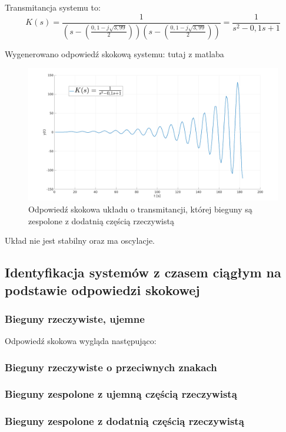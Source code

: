\documentclass[12pt]{article}
\begin{document}
Transmitancja systemu to:
\begin{equation}
    K(s) = \frac{1}{(s-(\frac{0,1 - j \sqrt{3,99}}{2}))(s-(\frac{0,1 - j \sqrt{3,99}}{2}))} = \frac{1}{s^2-0,1s+1}
\end{equation}

Wygenerowano odpowiedź skokową systemu:
\colorbox{WildStrawberry}{tutaj z matlaba}

\begin{figure}[H]
    \centering
    \includegraphics[width=18cm]{zespolone_dodatnia.png}
    \caption{Odpowiedź skokowa układu o transmitancji, której bieguny są zespolone z dodatnią częścią rzeczywistą}
\end{figure}

Układ nie jest stabilny oraz ma oscylacje.


\subsection{Identyfikacja systemów z czasem ciągłym na podstawie odpowiedzi skokowej}
\subsubsection{Bieguny rzeczywiste, ujemne}

Odpowiedź skokowa wygląda następująco:



\subsubsection{Bieguny rzeczywiste o przeciwnych znakach}
\subsubsection{Bieguny zespolone z ujemną częścią rzeczywistą}
\subsubsection{Bieguny zespolone z dodatnią częścią rzeczywistą}
\end{document}
